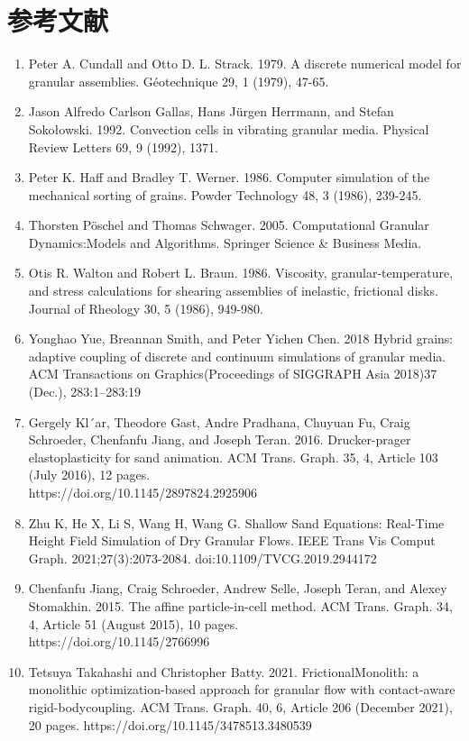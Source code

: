 \documentclass[12pt]{ltjsarticle}
\begin{document}
\section*{参考文献}
\renewcommand{\labelenumi}{[\arabic{enumi}]}
\begin{enumerate}
\item Peter A. Cundall and Otto D. L. Strack. 1979. A discrete numerical model for granular assemblies. Géotechnique 29, 1 (1979), 47-65.
\item Jason Alfredo Carlson Gallas, Hans Jürgen Herrmann, and Stefan Sokołowski. 1992. Convection cells in vibrating granular media. Physical Review Letters 69, 9 (1992), 1371.
\item Peter K. Haff and Bradley T. Werner. 1986. Computer simulation of the mechanical sorting of grains. Powder Technology 48, 3 (1986), 239-245.
\item Thorsten Pöschel and Thomas Schwager. 2005. Computational Granular Dynamics:Models and Algorithms. Springer Science \& Business Media.
\item Otis R. Walton and Robert L. Braun. 1986. Viscosity, granular-temperature, and stress calculations for shearing assemblies of inelastic, frictional disks. Journal of Rheology 30, 5 (1986), 949-980.
\item Yonghao Yue, Breannan Smith, and Peter Yichen Chen. 2018 Hybrid grains: adaptive coupling of discrete and continuum simulations of granular media. ACM Transactions on Graphics(Proceedings of SIGGRAPH Asia 2018)37 (Dec.), 283:1–283:19
\item Gergely Kl´ar, Theodore Gast, Andre Pradhana, Chuyuan Fu, Craig Schroeder, Chenfanfu Jiang, and Joseph Teran. 2016. Drucker-prager elastoplasticity for sand animation. ACM Trans. Graph. 35, 4, Article 103 (July 2016), 12 pages. \\ https://doi.org/10.1145/2897824.2925906
\item Zhu K, He X, Li S, Wang H, Wang G. Shallow Sand Equations: Real-Time Height Field Simulation of Dry Granular Flows. IEEE Trans Vis Comput Graph. 2021;27(3):2073-2084. doi:10.1109/TVCG.2019.2944172
\item Chenfanfu Jiang, Craig Schroeder, Andrew Selle, Joseph Teran, and Alexey Stomakhin. 2015. The affine particle-in-cell method. ACM Trans. Graph. 34, 4, Article 51 (August 2015), 10 pages.\\ https://doi.org/10.1145/2766996
\item Tetsuya Takahashi and Christopher Batty. 2021. FrictionalMonolith: a monolithic optimization-based approach for granular flow with contact-aware rigid-bodycoupling. ACM Trans. Graph. 40, 6, Article 206 (December 2021), 20 pages. https://doi.org/10.1145/3478513.3480539

\end{enumerate}
\end{document}
